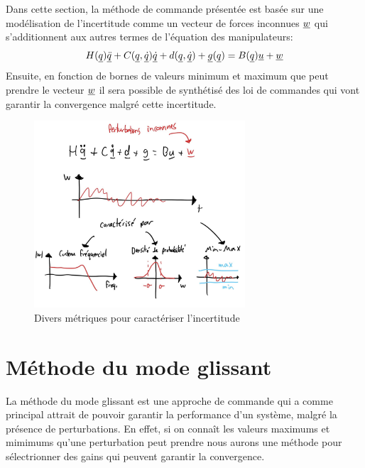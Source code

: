 Dans cette section, la méthode de commande présentée est basée sur une modélisation de l'incertitude comme un vecteur de forces inconnues $\underline{w}$ qui s'additionnent aux autres termes de l'équation des manipulateurs:
\begin{align}
H(\underline{q}) \underline{\ddot{q}} + C(\underline{q},\underline{\dot{q}}) \underline{\dot{q}} + d(\underline{q}, \underline{\dot{q}}) + \underline{g}(\underline{q}) = B(\underline{q}) \underline{u}  + \underline{w}
\end{align}
Ensuite, en fonction de bornes de valeurs minimum et maximum que peut prendre le vecteur $\underline{w}$ il sera possible de synthétisé des loi de commandes qui vont garantir la convergence malgré cette incertitude.



\begin{figure}[htp]
\vspace{-10pt}
	\centering
		\includegraphics[width=0.7\textwidth]{fig/disturbances.jpeg}
  \vspace{-10pt}
	\caption{Divers métriques pour caractériser l'incertitude}
	\label{fig:disturbances}
\end{figure}



\newpage
\section{Méthode du mode glissant}

La méthode du mode glissant est une approche de commande qui a comme principal attrait de pouvoir garantir la performance d'un système, malgré la présence de perturbations. En effet, si on connaît les valeurs maximums et mimimums qu'une perturbation peut prendre nous aurons une méthode pour sélectrionner des gains qui peuvent garantir la convergence.

